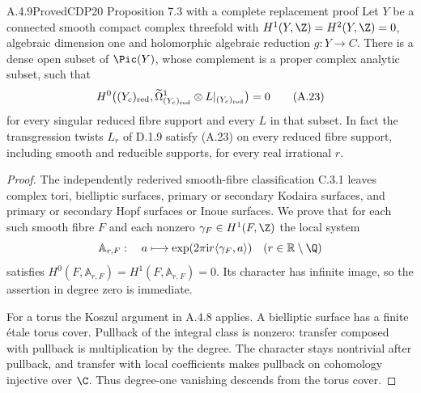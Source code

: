 \begin{statement}{A.4.9}{Proved}{CDP20 Proposition 7.3 with a complete replacement proof}
Let $Y$ be a connected smooth compact complex threefold with $H^1(Y,\Z)=H^2(Y,\Z)=0$, algebraic dimension one and holomorphic algebraic reduction $g:Y\to C$. There is a dense open subset of $\Pic(Y)$, whose complement is a proper complex analytic subset, such that
\[
 H^0\bigl((Y_c)_{\rm red},
       \widetilde\Omega^1_{(Y_c)_{\rm red}}\otimes L|_{(Y_c)_{\rm red}}\bigr)=0
 \tag{A.23}
\]
for every singular reduced fibre support and every $L$ in that subset. In fact the transgression twists $L_r$ of D.1.9 satisfy (A.23) on every reduced fibre support, including smooth and reducible supports, for every real irrational $r$.
\end{statement}
\begin{proof}
The independently rederived smooth-fibre classification C.3.1 leaves complex tori, bielliptic surfaces, primary or secondary Kodaira surfaces, and primary or secondary Hopf surfaces or Inoue surfaces. We prove that for each such smooth fibre $F$ and each nonzero $\gamma_F\in H^1(F,\Z)$ the local system
\[
 \mathbb A_{r,F}:\quad a\longmapsto
       \exp(2\pi\mathrm i r\langle\gamma_F,a\rangle)
 \quad(r\in\mathbb R\setminus\Q)
\]
satisfies $H^0(F,\mathbb A_{r,F})=H^1(F,\mathbb A_{r,F})=0$. Its character has infinite image, so the assertion in degree zero is immediate.

For a torus the Koszul argument in A.4.8 applies. A bielliptic surface has a finite étale torus cover. Pullback of the integral class is nonzero: transfer composed with pullback is multiplication by the degree. The character stays nontrivial after pullback, and transfer with local coefficients makes pullback on cohomology injective over $\C$. Thus degree-one vanishing descends from the torus cover.


\end{proof}
